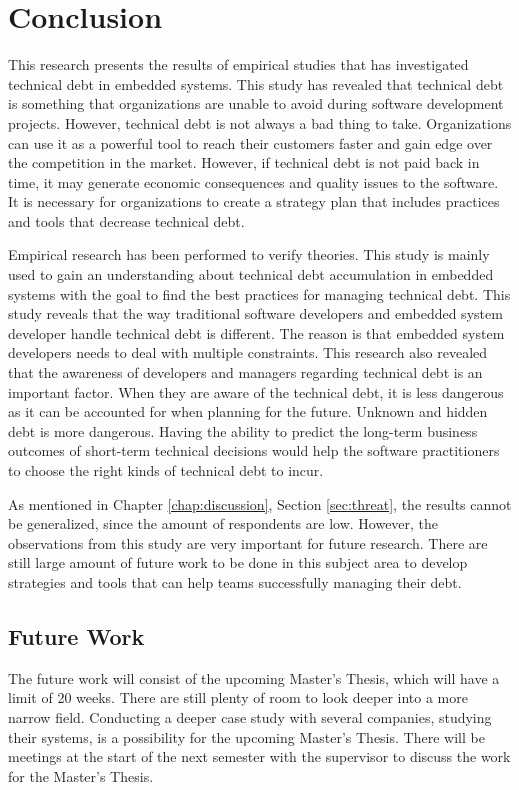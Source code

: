 



\chapter{Conclusion}
This research presents the results of empirical studies that has investigated technical debt in embedded systems. This study has revealed that technical debt is something that organizations are unable to avoid during software development projects. However, technical debt is not always a bad thing to take. Organizations can use it as a powerful tool to reach their customers faster and gain edge over the competition in the market. However, if technical debt is not paid back in time, it may generate economic consequences and quality issues to the software. It is necessary for organizations to create a strategy plan that includes practices and tools that decrease technical debt.

Empirical research has been performed to verify theories. This study is mainly used to gain an understanding about technical debt accumulation in embedded systems with the goal to find the best practices for managing technical debt. This study reveals that the way traditional software developers and embedded system developer handle technical debt is different. The reason is that embedded system developers needs to deal with multiple constraints. This research also revealed that the awareness of developers and managers regarding technical debt is an important factor. When they are aware of the technical debt, it is less dangerous as it can be accounted for when planning for the future. Unknown and hidden debt is more dangerous. Having the ability to predict the long-term business outcomes of short-term technical decisions would help the software practitioners to choose the right kinds of technical debt to incur.

As mentioned in Chapter \ref{chap:discussion}, Section \ref{sec:threat}, the results cannot be generalized, since the amount of respondents are low. However, the observations from this study are very important for future research. There are still large amount of future work to be done in this subject area to develop strategies and tools that can help teams successfully managing their debt. 

\section{Future Work}
The future work will consist of the upcoming Master's Thesis, which will have a limit of 20 weeks. There are still plenty of room to look deeper into a more narrow field. Conducting a deeper case study with several companies, studying their systems, is a possibility for the upcoming Master's Thesis. There will be meetings at the start of the next semester with the supervisor to discuss the work for the Master's Thesis.